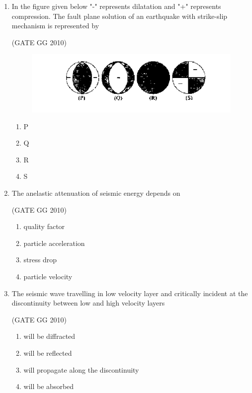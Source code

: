 \documentclass[journal]{IEEEtran}
\begin{document}
\begin{enumerate}[start=26]
\begin{multicols}{4}
\begin{enumerate}
\item  32

\item 64

\item 100
\end{enumerate}
\end{multicols}

\item In the figure given below "-" represents dilatation and "+" represents compression. The fault plane solution of an earthquake with strike-slip mechanism is represented by

\hfill (GATE GG 2010) 
\begin{multicols}{4}

\begin{figure}[H]
    \centering
    \includegraphics[width=0.5\linewidth]{figs/03.png} 
    \caption{}
    \label{fig:3}
\end{figure}
\begin{enumerate}
    \item P
    \item Q
    \item R
    \item S
\end{enumerate}
\end{multicols}

\item  The anelastic attenuation of seismic energy depends on

\hfill (GATE GG 2010) 

\begin{enumerate}
    \item  quality factor
\item  particle acceleration
\item stress drop
\item  particle velocity
\end{enumerate}
 \item The seismic wave travelling in low velocity layer and critically incident at the discontinuity between low and high velocity layers
 
 \hfill (GATE GG 2010) 
 
\begin{enumerate}
    \item  will be diffracted
\item  will be reflected
\item  will propagate along the discontinuity
\item will be absorbed
\end{enumerate}


\end{enumerate}
\end{document}
